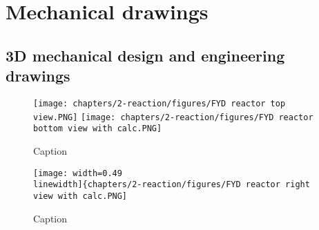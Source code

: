 \section{Mechanical drawings}
\label{app:reactor-drawings}
\subsection{3D mechanical design and engineering drawings}
\label{app:engineeringdesign}

\begin{figure}[H]
    \centering

    \texttt{[image: chapters/2-reaction/figures/FYD reactor top view.PNG]}
    \texttt{[image: chapters/2-reaction/figures/FYD reactor bottom view with calc.PNG]}
    \caption{Caption}
    \label{fig:reactorbottom}
\end{figure}

\begin{figure}
    \centering
    \texttt{[image: width=0.49\\linewidth]\{chapters/2-reaction/figures/FYD reactor right view with calc.PNG]}
    \caption{Caption}
    \label{fig:my_label}
\end{figure}